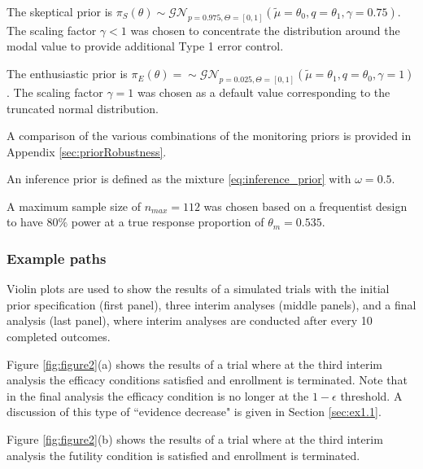\documentclass[12pt]{article}
\begin{document}
The skeptical prior is $\pi_S(\theta)\sim\mathcal{GN}_{p=0.975,\Theta=[0,1]}(\tilde{\mu}=\theta_0,q=\theta_1,\gamma=0.75)$. The scaling factor $\gamma<1$ was chosen to concentrate the distribution around the modal value to provide additional Type 1 error control. 

The enthusiastic prior is $\pi_E(\theta)=\sim\mathcal{GN}_{p=0.025,\Theta=[0,1]}(\tilde{\mu}=\theta_1,q=\theta_0,\gamma=1)$. The scaling factor $\gamma=1$ was chosen as a default value corresponding to the truncated normal distribution.

A comparison of the various combinations of the monitoring priors is provided in Appendix \ref{sec:priorRobustness}.

An inference prior is defined as the mixture \eqref{eq:inference_prior} with $\omega=0.5$.

A maximum sample size of $n_{max}=112$ was chosen based on a frequentist design to have $80\%$ power at a true response proportion of $\theta_m=0.535$.

\subsubsection{Example paths}
Violin plots are used to show the results of a simulated trials with the initial prior specification (first panel), three interim analyses (middle panels), and a final analysis (last panel), where interim analyses are conducted after every 10 completed outcomes. 

Figure \ref{fig:figure2}(a) shows the results of a trial where at the third interim analysis the efficacy conditions satisfied and enrollment is terminated. Note that in the final analysis the efficacy condition is no longer at the $1-\epsilon$ threshold. A discussion of this type of ``evidence decrease" is given in Section \ref{sec:ex1.1}.

Figure \ref{fig:figure2}(b) shows the results of a trial where at the third interim analysis the futility condition is satisfied and enrollment is terminated. 
\end{document}
